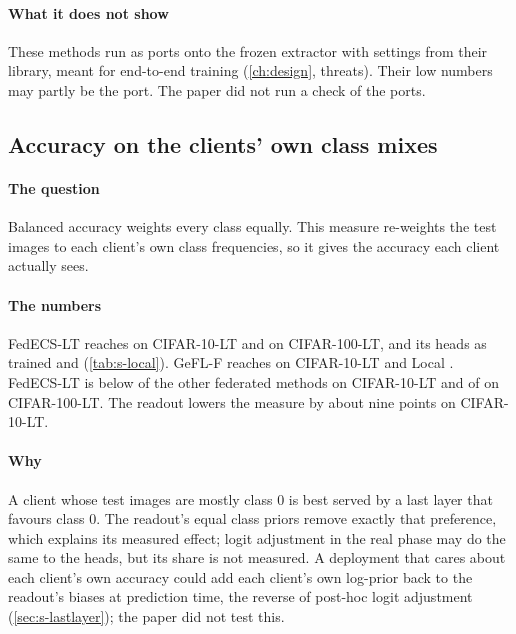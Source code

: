 \paragraph{What it does not show} These methods run as ports onto the frozen extractor with settings from their
library, meant for end-to-end training (\cref{ch:design}, threats). Their low numbers may partly be the port. The paper
did not run a check of the ports.

\subsection{Accuracy on the clients' own class mixes}

\paragraph{The question} Balanced accuracy weights every class equally. This measure re-weights the test images to
each client's own class frequencies, so it gives the accuracy each client actually sees.

\begin{table}[t]
\centering\small
\caption{Accuracy (\%) on each client's own class mix, from the paper's appendix; FedECS-LT with its readout, other
methods with heads as trained. Look at the first two rows: the readout lowers this measure.}
\label{tab:s-local}
\end{table}

\paragraph{The numbers} FedECS-LT reaches  on CIFAR-10-LT and
 on CIFAR-100-LT, and its heads as trained 
and  (\cref{tab:s-local}). GeFL-F reaches 
on CIFAR-10-LT and Local . FedECS-LT is below  of the
 other federated methods on CIFAR-10-LT and  of
 on CIFAR-100-LT. The readout lowers the measure by about nine points on CIFAR-10-LT.

\paragraph{Why} A client whose test images are mostly class 0 is best served by a last layer that favours class 0.
The readout's equal class priors remove exactly that preference, which explains its measured effect; logit
adjustment in the real phase may do the same to the heads, but its share is not measured. A deployment that cares
about each client's own accuracy could add each client's own log-prior back to the readout's biases at prediction
time, the reverse of post-hoc logit adjustment (\cref{sec:s-lastlayer}); the paper did not test this.

